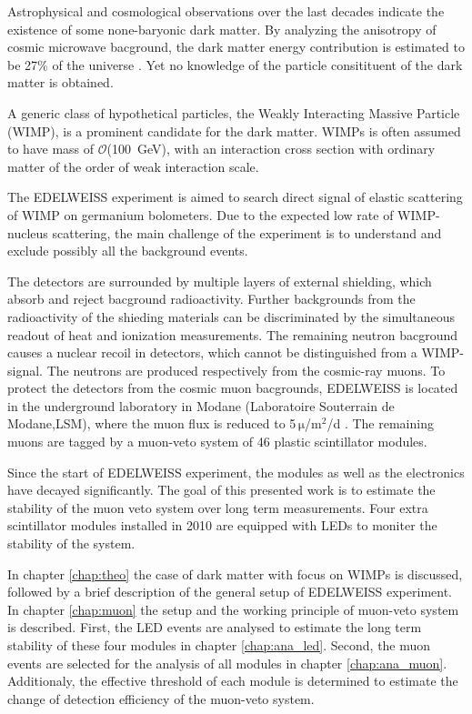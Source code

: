 Astrophysical and cosmological observations over the last decades indicate the existence of some none-baryonic dark matter. By analyzing the anisotropy of cosmic microwave bacground, the dark matter energy contribution is estimated to be 27\% of the universe \cite{Ade16}. Yet no knowledge of the particle consitituent of the dark matter is obtained.

A generic class of hypothetical particles, the Weakly Interacting Massive Particle (WIMP), is a prominent candidate for the dark matter. WIMPs is often assumed to have mass of $\mathcal{O}$(\SI{100}{GeV}), with an interaction cross section with ordinary matter of the order of weak interaction scale.

The EDELWEISS experiment is aimed to search direct signal of elastic scattering of WIMP on germanium bolometers. Due to the expected low rate of WIMP-nucleus scattering, the main challenge of the experiment is to understand and exclude possibly all the background events.

The detectors are surrounded by multiple layers of external shielding, which absorb and reject bacground radioactivity. Further backgrounds from the radioactivity of the shieding materials can be discriminated by the simultaneous readout of heat and ionization measurements. The remaining neutron bacground causes a nuclear recoil in detectors, which cannot be distinguished from a WIMP-signal. The neutrons are produced respectively from the cosmic-ray muons. To protect the detectors from the cosmic muon bacgrounds, EDELWEISS is located in the underground laboratory in Modane (Laboratoire Souterrain de Modane,LSM), where the muon flux is reduced to 5\,$\mathrm{\mu}$/$\mathrm{m}^{2}$/d \cite{Sch13a}. The remaining muons are tagged by a muon-veto system of 46 plastic scintillator modules.

Since the start of EDELWEISS experiment, the modules as well as the electronics have decayed significantly. The goal of this presented work is to estimate the stability of the muon veto system over long term measurements. Four extra scintillator modules installed in 2010 are equipped with LEDs to moniter the stability of the system.

In chapter \ref{chap:theo} the case of dark matter with focus on WIMPs is discussed, followed by a brief description of the general setup of EDELWEISS experiment. In chapter \ref{chap:muon} the setup and the working principle of muon-veto system is described. First, the LED events are analysed to estimate the long term stability of these four modules in chapter \ref{chap:ana_led}. Second, the muon events are selected for the analysis of all modules in chapter \ref{chap:ana_muon}. Additionaly, the effective threshold of each module is determined to estimate the change of detection efficiency of the muon-veto system.
